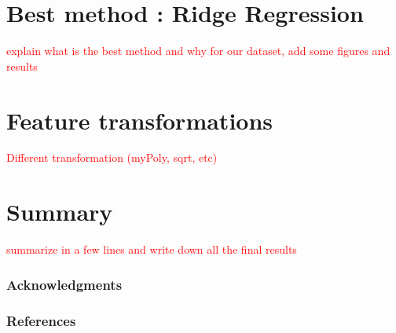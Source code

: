 \documentclass{article} %
\begin{document}
\section{Best method : Ridge Regression}
\textcolor{red}{explain what is the best method and why for our dataset, add some figures and results}
\section{Feature transformations}
\textcolor{red}{Different transformation (myPoly, sqrt, etc)}
\section{Summary}
\textcolor{red}{summarize in a few lines and write down all the final results}


\subsubsection*{Acknowledgments}


\subsubsection*{References}
\end{document}
